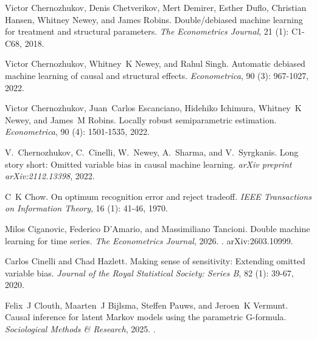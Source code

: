 Victor Chernozhukov, Denis Chetverikov, Mert Demirer, Esther Duflo, Christian Hansen, Whitney Newey, and James Robins.
\newblock Double/debiased machine learning for treatment and structural parameters.
\newblock \emph{The Econometrics Journal}, 21 (1): C1-C68, 2018.

Victor Chernozhukov, Whitney~K Newey, and Rahul Singh.
\newblock Automatic debiased machine learning of causal and structural effects.
\newblock \emph{Econometrica}, 90 (3): 967-1027, 2022{}.

Victor Chernozhukov, Juan~Carlos Escanciano, Hidehiko Ichimura, Whitney~K Newey, and James~M Robins.
\newblock Locally robust semiparametric estimation.
\newblock \emph{Econometrica}, 90 (4): 1501-1535, 2022{}.

V.~Chernozhukov, C.~Cinelli, W.~Newey, A.~Sharma, and V.~Syrgkanis.
\newblock Long story short: Omitted variable bias in causal machine learning.
\newblock \emph{arXiv preprint arXiv:2112.13398}, 2022.

C~K Chow.
\newblock On optimum recognition error and reject tradeoff.
\newblock \emph{IEEE Transactions on Information Theory}, 16 (1): 41-46, 1970.

Milos Ciganovic, Federico D'Amario, and Massimiliano Tancioni.
\newblock Double machine learning for time series.
\newblock \emph{The Econometrics Journal}, 2026.
\newblock {}.
\newblock arXiv:2603.10999.

Carlos Cinelli and Chad Hazlett.
\newblock Making sense of sensitivity: Extending omitted variable bias.
\newblock \emph{Journal of the Royal Statistical Society: Series B}, 82 (1): 39-67, 2020.

Felix~J Clouth, Maarten~J Bijlsma, Steffen Pauws, and Jeroen~K Vermunt.
\newblock Causal inference for latent {M}arkov models using the parametric {G}-formula.
\newblock \emph{Sociological Methods \& Research}, 2025.
\newblock {}.


